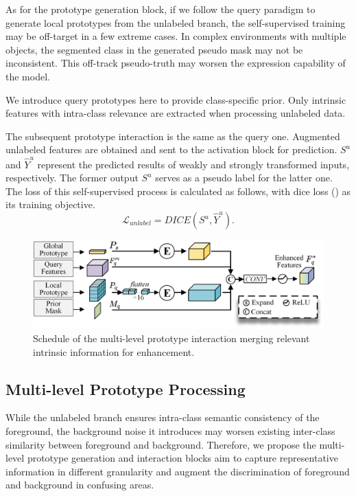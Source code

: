 \documentclass[letterpaper]{article} %
\begin{document}
As for the prototype generation block, if we follow the query paradigm to generate local prototypes from the unlabeled branch, the self-supervised training may be off-target in a few extreme cases. In complex environments with multiple objects, the segmented class in the generated pseudo mask may not be inconsistent. This off-track pseudo-truth may worsen the expression capability of the model.

We introduce query prototypes here to provide class-specific prior. Only intrinsic features with intra-class relevance are extracted when processing unlabeled data.

The subsequent prototype interaction is the same as the query one. Augmented unlabeled features are obtained and sent to the activation block for prediction. $S^u$ and $\hat{Y}^u$ represent the predicted results of weakly and strongly transformed inputs, respectively. The former output $S^u$ serves as a pseudo label for the latter one. The loss of this self-supervised process is calculated as follows, with dice loss (\citeauthor{milletari2016v}) as its training objective.
\begin{equation}
\mathcal{L}_{unlabel} = DICE(S^u,\hat{Y}^u).
\end{equation}%

\begin{figure}
\centering
\includegraphics[width=\linewidth]{interaction.pdf}

\caption{Schedule of the multi-level prototype interaction merging relevant intrinsic information for enhancement. }
\label{interaction}
\end{figure}

\subsection{Multi-level Prototype Processing}
While the unlabeled branch ensures intra-class semantic consistency of the foreground, the background noise it introduces may worsen existing inter-class similarity between foreground and background. Therefore, we propose the multi-level prototype generation and interaction blocks aim to capture representative information in different granularity and augment the discrimination of foreground and background in confusing areas.
\end{document}
